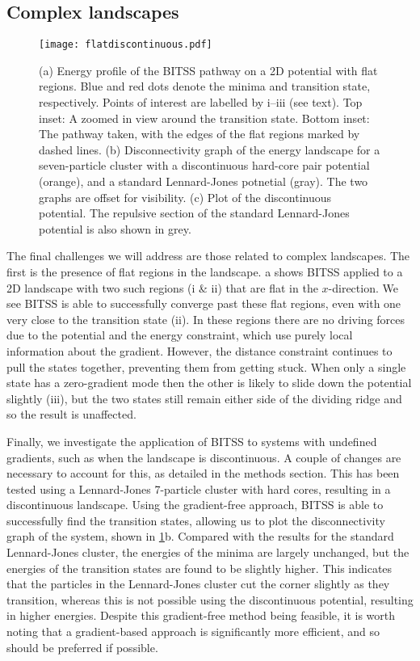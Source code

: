 \documentclass[twocolumn,10pt]{revtex4-2}
\begin{document}
\subsection{Complex landscapes}
\begin{figure}[tb]
  \texttt{[image: flatdiscontinuous.pdf]}
  \caption{\label{fig:flatdiscontinuous}
    (a) Energy profile of the BITSS pathway on a 2D potential with flat regions.
        Blue and red dots denote the minima and transition state, respectively.
        Points of interest are labelled by i--iii (see text).
        Top inset: A zoomed in view around the transition state.
        Bottom inset: The pathway taken, with the edges of the flat regions marked by dashed lines.
    (b) Disconnectivity graph of the energy landscape for a seven-particle cluster with a discontinuous hard-core pair potential (orange), and a standard Lennard-Jones potnetial (gray).
        The two graphs are offset for visibility.
    (c) Plot of the discontinuous potential.
        The repulsive section of the standard Lennard-Jones potential is also shown in grey.
  }
\end{figure}

The final challenges we will address are those related to complex landscapes.
The first is the presence of flat regions in the landscape.
a shows BITSS applied to a 2D landscape with two such regions (i \& ii) that are flat in the $x$-direction.
We see BITSS is able to successfully converge past these flat regions, even with one very close to the transition state (ii).
In these regions there are no driving forces due to the potential and the energy constraint, which use purely local information about the gradient.
However, the distance constraint continues to pull the states together, preventing them from getting stuck.
When only a single state has a zero-gradient mode then the other is likely to slide down the potential slightly (iii), but the two states still remain either side of the dividing ridge and so the result is unaffected.


Finally, we investigate the application of BITSS to systems with undefined gradients, such as when the landscape is discontinuous.
A couple of changes are necessary to account for this, as detailed in the methods section.
This has been tested using a Lennard-Jones 7-particle cluster with hard cores, resulting in a discontinuous landscape.
Using the gradient-free approach, BITSS is able to successfully find the transition states, allowing us to plot the disconnectivity graph of the system, shown in \cref{fig:flatdiscontinuous}b.
Compared with the results for the standard Lennard-Jones cluster, the energies of the minima are largely unchanged, but the energies of the transition states are found to be slightly higher.
This indicates that the particles in the Lennard-Jones cluster cut the corner slightly as they transition, whereas this is not possible using the discontinuous potential, resulting in higher energies.
Despite this gradient-free method being feasible, it is worth noting that a gradient-based approach is significantly more efficient, and so should be preferred if possible.
\end{document}
